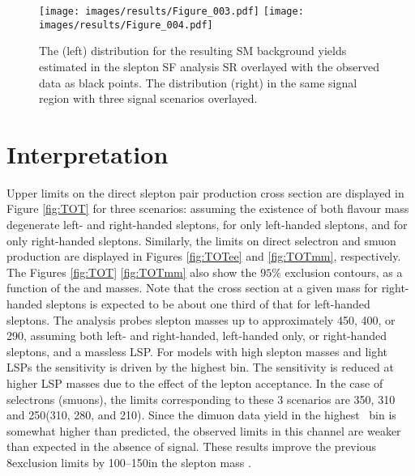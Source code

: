 \begin{figure}[ht!]
\centering
\texttt{[image: images/results/Figure\_003.pdf]}
\texttt{[image: images/results/Figure\_004.pdf]}
\caption{The \ptmiss (left) distribution for the resulting SM background yields estimated in the slepton SF analysis SR overlayed with the observed data as black points.
The \mttwo distribution (right) in the same signal region with three signal scenarios overlayed.}
\label{fig:results}
\end{figure}
\section{Interpretation}
\noindent
\justify
Upper limits on the direct slepton pair production cross section are displayed in Figure \ref{fig:TOT} for three scenarios: assuming the existence of both flavour mass degenerate left- and
right-handed sleptons, for only left-handed sleptons, and for only right-handed sleptons. 
Similarly, the limits on direct selectron and smuon production are displayed in Figures \ref{fig:TOTee} and \ref{fig:TOTmm}, respectively.
The Figures \ref{fig:TOT} \ref{fig:TOTmm} also show the $95\%$ \CL exclusion contours, as a function of the \slep and \lsp masses.
Note that the cross section at a given mass for right-handed sleptons is expected to be about one third of that for left-handed sleptons.
The analysis probes slepton masses up to approximately 450, 400, or 290\GeV, assuming both left- and right-handed, left-handed only, or right-handed sleptons, and a massless LSP.
For models with high slepton masses and light LSPs the sensitivity is driven by the highest \ptmiss bin. The sensitivity is reduced at higher LSP masses due to the effect of the lepton acceptance.
In the case of selectrons (smuons), the limits corresponding to these 3 scenarios are 350, 310 and 250\GeV (310, 280, and 210\GeV).
Since the dimuon data yield in the highest \ptmiss\ bin is somewhat higher than predicted, the observed limits in this channel are weaker than expected in the absence of signal.
These results improve the previous 8\TeV exclusion limits by 100--150\GeV in the slepton mass \cite{Khachatryan:2014qwa}.
